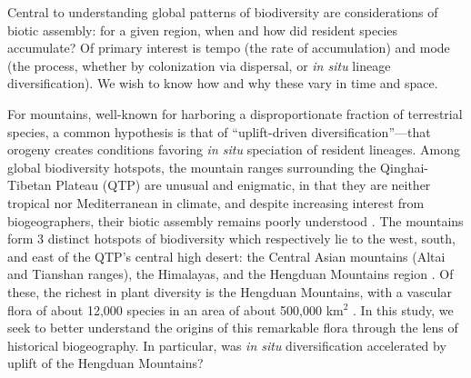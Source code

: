 

Central to understanding global patterns of biodiversity are considerations of biotic assembly: for a given region, when and how did resident species accumulate? Of primary interest is tempo (the rate of accumulation) and mode (the process, whether by colonization via dispersal, or \textit{in situ} lineage diversification). We wish to know how and why these vary in time and space.

For mountains, well-known for harboring a disproportionate fraction of terrestrial species, a common hypothesis is that of ``uplift-driven diversification''---that orogeny creates conditions favoring \textit{in situ} speciation of resident lineages. Among global biodiversity hotspots, the mountain ranges surrounding the Qinghai-Tibetan Plateau (QTP) are unusual and enigmatic, in that they are neither tropical nor Mediterranean in climate, and despite increasing interest from biogeographers, their biotic assembly remains poorly understood \citep{Favre2015,Wen2014,Hughes2015}. The mountains form 3 distinct hotspots of biodiversity which respectively lie to the west, south, and east of the QTP's central high desert: the Central Asian mountains (Altai and Tianshan ranges), the Himalayas, and the Hengduan Mountains region \citep{Favre2015}. Of these, the richest in plant diversity is the Hengduan Mountains, with a vascular flora of about 12,000 species in an area of about 500,000 km$^2$ \citep{Boufford2014,LiEtLi1993,Wu1988}. In this study, we seek to better understand the origins of this remarkable flora through the lens of historical biogeography. In particular, was \textit{in situ} diversification accelerated by uplift of the Hengduan Mountains?


